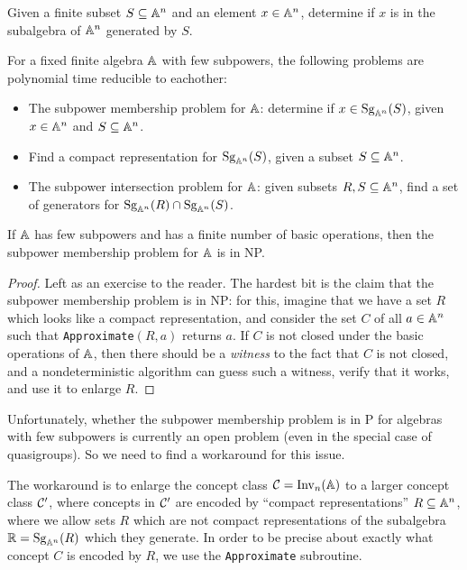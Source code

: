\documentclass[letterpaper,11pt]{article}
\DeclareMathOperator{\Inv}{Inv}
\DeclareMathOperator{\Sg}{Sg}
\begin{document}
\begin{prob}\label{subpower-membership} Given a finite subset $S \subseteq \mathbb{A}^n$ and an element $x \in \mathbb{A}^n$, determine if $x$ is in the subalgebra of $\mathbb{A}^n$ generated by $S$.
\end{prob}

\begin{thm} For a fixed finite algebra $\mathbb{A}$ with few subpowers, the following problems are polynomial time reducible to eachother:
\begin{itemize}
\item The subpower membership problem for $\mathbb{A}$: determine if $x \in \Sg_{\bA^n}(S)$, given $x \in \mathbb{A}^n$ and $S \subseteq \mathbb{A}^n$.

\item Find a compact representation for $\Sg_{\bA^n}(S)$, given a subset $S \subseteq \mathbb{A}^n$.

\item The subpower intersection problem for $\mathbb{A}$: given subsets $R,S \subseteq \mathbb{A}^n$, find a set of generators for $\Sg_{\bA^n}(R) \cap \Sg_{\bA^n}(S)$.
\end{itemize}
If $\mathbb{A}$ has few subpowers and has a finite number of basic operations, then the subpower membership problem for $\mathbb{A}$ is in NP.
\end{thm}
\begin{proof} Left as an exercise to the reader. The hardest bit is the claim that the subpower membership problem is in NP: for this, imagine that we have a set $R$ which looks like a compact representation, and consider the set $C$ of all $a \in \mathbb{A}^n$ such that \texttt{Approximate}$(R,a)$ returns $a$. If $C$ is not closed under the basic operations of $\mathbb{A}$, then there should be a \emph{witness} to the fact that $C$ is not closed, and a nondeterministic algorithm can guess such a witness, verify that it works, and use it to enlarge $R$.
\end{proof}

Unfortunately, whether the subpower membership problem is in P for algebras with few subpowers is currently an open problem (even in the special case of quasigroups). So we need to find a workaround for this issue.

The workaround is to enlarge the concept class $\cC = \Inv_n(\bA)$ to a larger concept class $\mathcal{C}'$, where concepts in $\mathcal{C}'$ are encoded by ``compact representations'' $R \subseteq \mathbb{A}^n$, where we allow sets $R$ which are not compact representations of the subalgebra $\RR = \Sg_{\bA^n}(R)$ which they generate. In order to be precise about exactly what concept $C$ is encoded by $R$, we use the \texttt{Approximate} subroutine.
\end{document}
